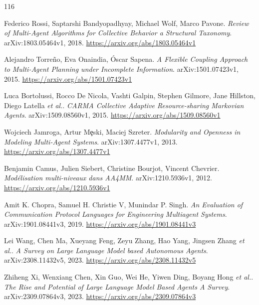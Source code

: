 \documentclass[11pt,a4paper]{article}
\begin{document}
\begin{thebibliography}{116}
\setlength{\itemsep}{2pt}

Federico Rossi, Saptarshi Bandyopadhyay, Michael Wolf, Marco Pavone.
\newblock \emph{Review of Multi-Agent Algorithms for Collective Behavior a Structural Taxonomy}.
\newblock arXiv:1803.05464v1, 2018.
\newblock \url{https://arxiv.org/abs/1803.05464v1}

Alejandro Torre\~{n}o, Eva Onaindia, \'{O}scar Sapena.
\newblock \emph{A Flexible Coupling Approach to Multi-Agent Planning under Incomplete Information}.
\newblock arXiv:1501.07423v1, 2015.
\newblock \url{https://arxiv.org/abs/1501.07423v1}

Luca Bortolussi, Rocco De Nicola, Vashti Galpin, Stephen Gilmore, Jane Hillston, Diego Latella \emph{et al.}.
\newblock \emph{CARMA Collective Adaptive Resource-sharing Markovian Agents}.
\newblock arXiv:1509.08560v1, 2015.
\newblock \url{https://arxiv.org/abs/1509.08560v1}

Wojciech Jamroga, Artur M\c{e}ski, Maciej Szreter.
\newblock \emph{Modularity and Openness in Modeling Multi-Agent Systems}.
\newblock arXiv:1307.4477v1, 2013.
\newblock \url{https://arxiv.org/abs/1307.4477v1}

Benjamin Camus, Julien Siebert, Christine Bourjot, Vincent Chevrier.
\newblock \emph{Mod\'{e}lisation multi-niveaux dans AA4MM}.
\newblock arXiv:1210.5936v1, 2012.
\newblock \url{https://arxiv.org/abs/1210.5936v1}

Amit K. Chopra, Samuel H. Christie V, Munindar P. Singh.
\newblock \emph{An Evaluation of Communication Protocol Languages for Engineering Multiagent Systems}.
\newblock arXiv:1901.08441v3, 2019.
\newblock \url{https://arxiv.org/abs/1901.08441v3}

Lei Wang, Chen Ma, Xueyang Feng, Zeyu Zhang, Hao Yang, Jingsen Zhang \emph{et al.}.
\newblock \emph{A Survey on Large Language Model based Autonomous Agents}.
\newblock arXiv:2308.11432v5, 2023.
\newblock \url{https://arxiv.org/abs/2308.11432v5}

Zhiheng Xi, Wenxiang Chen, Xin Guo, Wei He, Yiwen Ding, Boyang Hong \emph{et al.}.
\newblock \emph{The Rise and Potential of Large Language Model Based Agents A Survey}.
\newblock arXiv:2309.07864v3, 2023.
\newblock \url{https://arxiv.org/abs/2309.07864v3}


\end{thebibliography}
\end{document}
